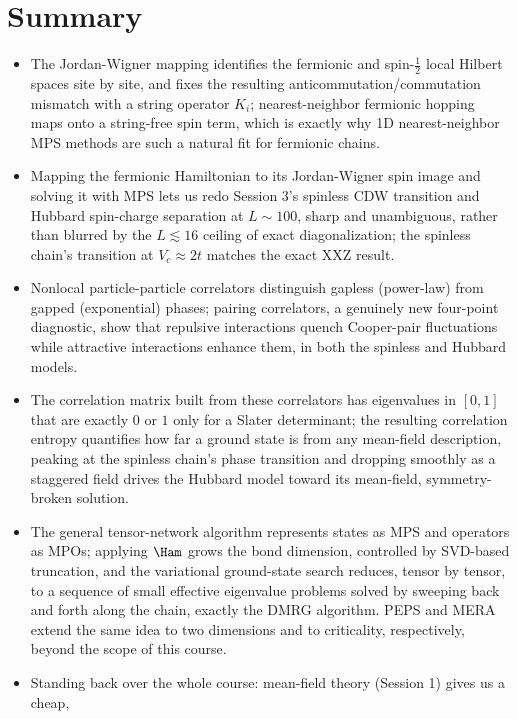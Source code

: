 \documentclass[all_sessions.tex]{subfiles}
\begin{document}
\section*{Summary}
\begin{itemize}[nosep]
  \item The Jordan-Wigner mapping identifies the fermionic and spin-$\tfrac12$ local Hilbert spaces
    site by site, and fixes the resulting anticommutation/commutation mismatch with a string
    operator $K_i$; nearest-neighbor fermionic hopping maps onto a string-free spin term, which is
    exactly why 1D nearest-neighbor MPS methods are such a natural fit for fermionic chains.
  \item Mapping the fermionic Hamiltonian to its Jordan-Wigner spin image and solving it with MPS
    lets us redo Session 3's spinless CDW transition and Hubbard spin-charge separation at
    $L\sim100$, sharp and unambiguous, rather than blurred by the $L\lesssim16$ ceiling of exact
    diagonalization; the spinless chain's transition at $V_c\approx2t$ matches the exact XXZ result.
  \item Nonlocal particle-particle correlators distinguish gapless (power-law) from gapped
    (exponential) phases; pairing correlators, a genuinely new four-point diagnostic, show that
    repulsive interactions quench Cooper-pair fluctuations while attractive interactions enhance
    them, in both the spinless and Hubbard models.
  \item The correlation matrix built from these correlators has eigenvalues in $[0,1]$ that are
    exactly $0$ or $1$ only for a Slater determinant; the resulting correlation entropy quantifies
    how far a ground state is from any mean-field description, peaking at the spinless chain's
    phase transition and dropping smoothly as a staggered field drives the Hubbard model toward its
    mean-field, symmetry-broken solution.
  \item The general tensor-network algorithm represents states as MPS and operators as MPOs;
    applying $\Ham$ grows the bond dimension, controlled by SVD-based truncation, and the
    variational ground-state search reduces, tensor by tensor, to a sequence of small effective
    eigenvalue problems solved by sweeping back and forth along the chain, exactly the DMRG
    algorithm. PEPS and MERA extend the same idea to two dimensions and to criticality,
    respectively, beyond the scope of this course.
  \item Standing back over the whole course: mean-field theory (Session 1) gives us a cheap,

\end{itemize}
\end{document}
